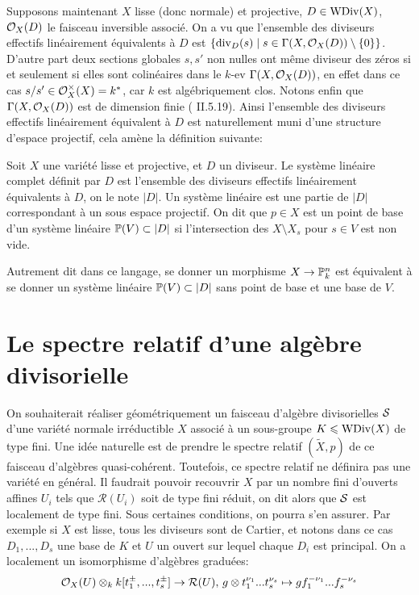 Supposons maintenant $X$ lisse (donc normale) et projective, $D\in \operatorname{WDiv}(X)$, $\mathcal{O}_X(D)$ le faisceau inversible associé. On a vu que l'ensemble des diviseurs effectifs linéairement équivalents à $D$ est $\lbrace \operatorname{div}_D(s)\mid s\in\Gamma(X,\mathcal{O}_X(D))\setminus\lbrace0\rbrace \rbrace$. D'autre part deux sections globales $s, s'$ non nulles ont même diviseur des zéros si et seulement si elles sont colinéaires dans le $k$-ev $\Gamma(X, \mathcal{O}_X(D))$, en effet dans ce cas $s/s'\in \mathcal{O}_X^\times(X)=k^*$, car $k$ est algébriquement clos. Notons enfin que $\Gamma(X, \mathcal{O}_X(D))$ est de dimension finie (\cite{Hartshorne} II.5.19). Ainsi l'ensemble des diviseurs effectifs linéairement équivalent à $D$ est naturellement muni d'une structure d'espace projectif, cela amène la définition suivante:
\begin{defn}
Soit $X$ une variété lisse et projective, et $D$ un diviseur. Le système linéaire complet définit par $D$ est l'ensemble des diviseurs effectifs linéairement équivalents à $D$, on le note $|D|$. Un système linéaire est une partie de $|D|$ correspondant à un sous espace projectif. On dit que $p\in X$ est un point de base d'un système linéaire $\mathbb{P}(V)\subset |D|$ si l'intersection des $X\setminus X_s$ pour $s\in V$ est non vide. 
\end{defn}

Autrement dit dans ce langage, se donner un morphisme $X\rightarrow \mathbb{P}^n_k$ est équivalent à se donner un système linéaire $\mathbb{P}(V)\subset |D|$ sans point de base et une base de $V$.


\section{Le spectre relatif d'une algèbre divisorielle}

\setcounter{subsection}{1}

On souhaiterait réaliser géométriquement un faisceau d'algèbre divisorielles $\mathcal{S}$ d'une variété normale irréductible $X$ associé à un sous-groupe $K\leqslant \operatorname{WDiv}(X)$ de type fini. Une idée naturelle est de prendre le spectre relatif $(\widetilde{X}, p)$ de ce faisceau d'algèbres quasi-cohérent. Toutefois, ce spectre relatif ne définira pas une variété en général. Il faudrait pouvoir recouvrir $X$ par un nombre fini d'ouverts affines $U_i$ tels que $\mathcal{R}(U_i)$ soit de type fini réduit, on dit alors que $\mathcal{S}$ est localement de type fini. Sous certaines conditions, on pourra s'en assurer. Par exemple si $X$ est lisse, tous les diviseurs sont de Cartier, et notons dans ce cas $D_1,...,D_s$ une base de $K$ et $U$ un ouvert sur lequel chaque $D_i$ est principal. On a localement un isomorphisme d'algèbres graduées:
\begin{equation} \label{eq:1}
\mathcal{O}_X(U)\otimes_k k[t_1^{\pm},...,t_s^{\pm}] \rightarrow \mathcal{R}(U),\, g\otimes t_1^{\nu_1}...t_s^{\nu_s}\mapsto gf_1^{-\nu_1}...f_s^{-\nu_s}
\end{equation}

